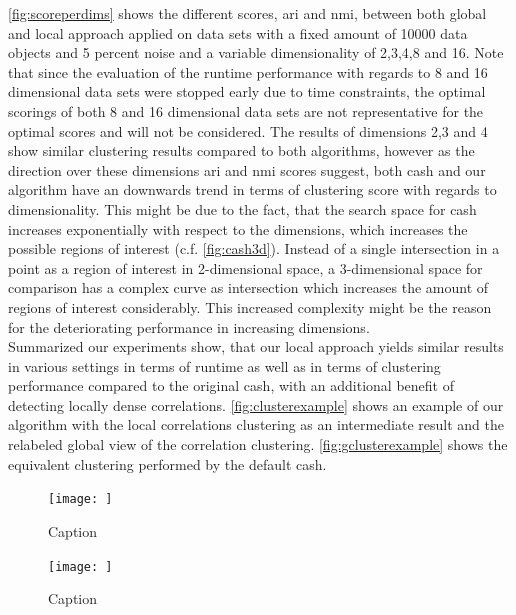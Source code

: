\autoref{fig:scoreperdims} shows the different scores, \gls{ari} and \gls{nmi}, between both global and local approach applied on data sets with a fixed amount of 10000 data objects and 5 percent noise and a variable dimensionality of 2,3,4,8 and 16.
Note that since the evaluation of the runtime performance with regards to 8 and 16 dimensional data sets were stopped early due to time constraints, the optimal scorings of both 8 and 16 dimensional data sets are not representative for the optimal scores and will not be considered. 
The results of dimensions 2,3 and 4 show similar clustering results compared to both algorithms, however as the direction over these dimensions \gls{ari} and \gls{nmi} scores suggest, both \gls{cash} and our algorithm have an downwards trend in terms of clustering score with regards to dimensionality. This might be due to the fact, that the search space for \gls{cash} increases exponentially with respect to the dimensions, which increases the possible regions of interest (c.f. \autoref{fig:cash3d}). Instead of a single intersection in a point as a region of interest in 2-dimensional space, a 3-dimensional space for comparison has a complex curve as intersection which increases the amount of regions of interest considerably. This increased complexity might be the reason for the deteriorating performance in increasing dimensions. \\

Summarized our experiments show, that our local approach yields similar results in various settings in terms of runtime as well as in terms of clustering performance compared to the original \gls{cash}, with an additional benefit of detecting locally dense correlations. \autoref{fig:clusterexample} shows an example of our algorithm with the local correlations clustering as an intermediate result and the relabeled global view of the correlation clustering. \autoref{fig:gclusterexample} shows the equivalent clustering performed by the default \gls{cash}. 

\begin{figure}
    \centering
    \texttt{[image: ]}
    \caption{Caption}
    \label{fig:clusterexample}
\end{figure}

\begin{figure}
    \centering
    \texttt{[image: ]}
    \caption{Caption}
    \label{fig:gclusterexample}
\end{figure}

